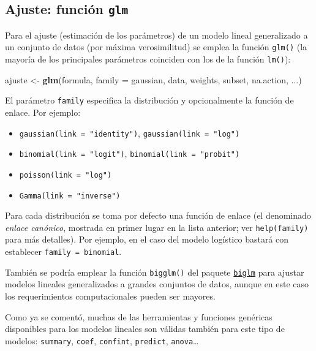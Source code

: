\documentclass[
  spanish,
]{book}
\newenvironment{Shaded}{\begin{snugshade}}{\end{snugshade}}
\newcommand{\DataTypeTok}[1]{\textcolor[rgb]{0.13,0.29,0.53}{#1}}
\newcommand{\KeywordTok}[1]{\textcolor[rgb]{0.13,0.29,0.53}{\textbf{#1}}}
\newcommand{\NormalTok}[1]{#1}
\newcommand{\StringTok}[1]{\textcolor[rgb]{0.31,0.60,0.02}{#1}}
\theoremstyle{break}
\theoremstyle{definition}
\theoremstyle{definition}
\theoremstyle{definition}
\theoremstyle{remark}
\begin{document}
\hypertarget{ajuste-funciuxf3n-glm}{%
\subsection{\texorpdfstring{Ajuste: función \texttt{glm}}{Ajuste: función glm}}\label{ajuste-funciuxf3n-glm}}

Para el ajuste (estimación de los parámetros) de un modelo lineal generalizado a un conjunto de datos (por máxima verosimilitud) se emplea la función \texttt{glm()} (la mayoría de los principales parámetros coinciden con los de la función \texttt{lm()}):

\begin{Shaded}
\begin{Highlighting}[]
\NormalTok{ajuste <-}\StringTok{ }\KeywordTok{glm}\NormalTok{(formula, }\DataTypeTok{family =}\NormalTok{ gaussian, data, weights, subset, na.action, ...)}
\end{Highlighting}
\end{Shaded}

El parámetro \texttt{family} especifica la distribución y opcionalmente la función de enlace.
Por ejemplo:

\begin{itemize}
\item
  \texttt{gaussian(link\ =\ "identity")}, \texttt{gaussian(link\ =\ "log")}
\item
  \texttt{binomial(link\ =\ "logit")}, \texttt{binomial(link\ =\ "probit")}
\item
  \texttt{poisson(link\ =\ "log")}
\item
  \texttt{Gamma(link\ =\ "inverse")}
\end{itemize}

Para cada distribución se toma por defecto una función de enlace (el denominado \emph{enlace canónico}, mostrada en primer lugar en la lista anterior; ver \texttt{help(family)} para más detalles).
Por ejemplo, en el caso del modelo logístico bastará con establecer \texttt{family\ =\ binomial}.

También se podría emplear la función \texttt{bigglm()} del paquete \href{https://CRAN.R-project.org/package=biglm}{\texttt{biglm}} para ajustar modelos lineales generalizados a grandes conjuntos de datos, aunque en este caso los requerimientos computacionales pueden ser mayores.

Como ya se comentó, muchas de las herramientas y funciones genéricas disponibles para los modelos lineales son válidas también para este tipo de modelos: \texttt{summary}, \texttt{coef}, \texttt{confint}, \texttt{predict}, \texttt{anova}\ldots{}
\end{document}
